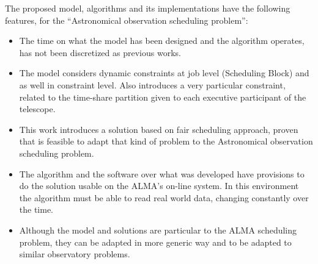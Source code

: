 The proposed model, algorithms and its implementations have the following features, for the ``Astronomical observation scheduling problem'':
\begin{itemize}
\item The time on what the model has been designed and the algorithm operates, has not been discretized as previous works.

\item The model considers dynamic constraints at job level (Scheduling Block) and as well in constraint level. Also introduces a very particular constraint, related to the time-share partition given to each executive participant of the telescope.

\item This work introduces a solution based on fair scheduling approach, proven that is feasible to adapt that kind of problem to the Astronomical observation scheduling problem.

\item The algorithm and the software over what was developed have provisions to do the solution usable on the ALMA's on-line system. In this environment the algorithm must be able to read real world data, changing constantly over the time. 

\item Although the model and solutions are particular to the ALMA scheduling problem, they can be adapted in more generic way and to be adapted to similar observatory problems.

\end{itemize} 


